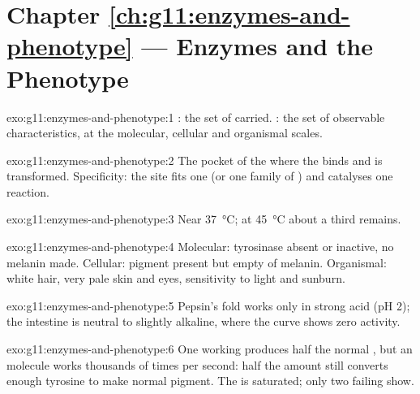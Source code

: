 \section*{Chapter \ref{ch:g11:enzymes-and-phenotype} --- Enzymes and the Phenotype}

\begin{solution}{exo:g11:enzymes-and-phenotype:1}
: the set of  carried. : the set of observable
characteristics, at the molecular, cellular and organismal scales.
\end{solution}

\begin{solution}{exo:g11:enzymes-and-phenotype:2}
The pocket of the  where the  binds and is transformed.
Specificity: the site fits one  (or one family of )
and catalyses one reaction.
\end{solution}

\begin{solution}{exo:g11:enzymes-and-phenotype:3}
Near \qty{37}{\celsius}; at \qty{45}{\celsius} about a third remains.
\end{solution}

\begin{solution}{exo:g11:enzymes-and-phenotype:4}
Molecular: tyrosinase absent or inactive, no melanin made. Cellular:
pigment  present but empty of melanin. Organismal: white hair,
very pale skin and eyes, sensitivity to light and sunburn.
\end{solution}

\begin{solution}{exo:g11:enzymes-and-phenotype:5}
Pepsin's fold works only in strong acid (pH 2); the intestine is
neutral to slightly alkaline, where the curve shows zero activity.
\end{solution}

\begin{solution}{exo:g11:enzymes-and-phenotype:6}
One working  produces half the normal , but an 
molecule works thousands of times per second: half the amount still
converts enough tyrosine to make normal pigment. The  is
saturated; only two failing  show.
\end{solution}

